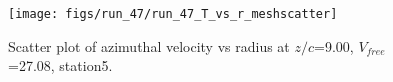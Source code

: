 \begin{figure}[H]
\centering
\texttt{[image: figs/run\_47/run\_47\_T\_vs\_r\_meshscatter]}
\caption{Scatter plot of azimuthal velocity vs radius at $z/c$=9.00, $V_{free}$=27.08, station5.}
\end{figure}


